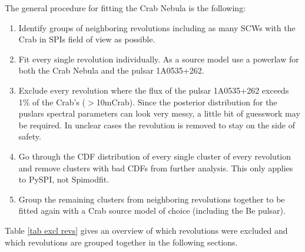 \documentclass{report}
\begin{document}
The general procedure for fitting the Crab Nebula is the following:
\begin{enumerate}
  \item Identify groups of neighboring revolutions including as many SCWs with the Crab in SPIs field of view as possible.
  \item Fit every single revolution individually. As a source model use a powerlaw for both the Crab Nebula and the pulsar 1A0535+262.
  \item Exclude every revolution where the flux of the pulsar 1A0535+262 exceeds 1\% of the Crab's ($>$10mCrab). Since the posterior distribution for the puslars spectral parameters can look very messy, a little bit of guesswork may be required. In unclear cases the revolution is removed to stay on the side of safety.
  \item Go through the CDF distribution of every single cluster of every revolution and remove clusters with bad CDFs from further analysis. This only applies to PySPI, not Spimodfit.
  \item Group the remaining clusters from neighboring revolutions together to be fitted again with a Crab source model of choice (including the Be pulsar).
\end{enumerate}
Table \ref{tab excl revs} gives an overview of which revolutions were excluded and which revolutions are grouped together in the following sections. 
\end{document}
